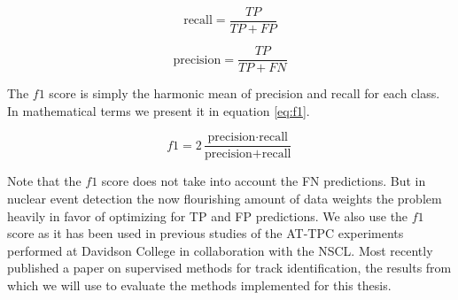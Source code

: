 \begin{equation}\label{eq:recall}
\text{recall}= \frac{TP}{TP + FP}
\end{equation}

\begin{equation}\label{eq:precision}
\text{precision} = \frac{TP}{TP + FN}
\end{equation}

\noindent The $f1$ score is simply the harmonic mean of precision and recall for each class. In mathematical terms we present it in equation \ref{eq:f1}.

\begin{equation}\label{eq:f1}
f1 = 2 \frac{\text{precision} \cdot \text{recall}}{\text{precision} + \text{recall}}
\end{equation}

\noindent Note that the $f1$ score does not take into account the FN predictions. But in nuclear event detection the now flourishing amount of data weights the problem heavily in favor of optimizing for TP and FP predictions. We also use the $f1$ score as it has been used in previous studies of the AT-TPC experiments performed at Davidson College in collaboration with the NSCL. Most recently \citet{Kuchera2019} published a paper on supervised methods for track identification, the  results from which we will use to evaluate the methods implemented for this thesis.


